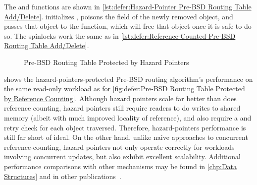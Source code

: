 \begin{fcvref}
The  and  functions are shown in
\cref{lst:defer:Hazard-Pointer Pre-BSD Routing Table Add/Delete}.
 initializes ,
 poisons the  field of the newly removed
object, and
 passes that object to the
 function, which will free that object once it
is safe to do so.
The spinlocks work the same as in
\cref{lst:defer:Reference-Counted Pre-BSD Routing Table Add/Delete}.
\end{fcvref}

\begin{figure}
\centering
{}
\caption{Pre-BSD Routing Table Protected by Hazard Pointers}
\label{fig:defer:Pre-BSD Routing Table Protected by Hazard Pointers}
\end{figure}

shows the hazard-pointers-protected Pre-BSD routing algorithm's
performance on the same read-only workload as for
\cref{fig:defer:Pre-BSD Routing Table Protected by Reference Counting}.
Although hazard pointers scale far better than does reference counting,
hazard pointers still require readers to do writes to shared
memory (albeit with much improved locality of reference),
and also require a  and retry check for each
object traversed.
Therefore, hazard-pointers performance is still far short of ideal.
On the other hand, unlike naive approaches to concurrent
reference-counting, hazard pointers not only operate correctly for
workloads involving concurrent updates, but also exhibit excellent
scalability.
Additional performance comparisons with other mechanisms may be found in
\cref{chp:Data Structures}
and in other publications~\cite{ThomasEHart2007a,McKenney:2013:SDS:2483852.2483867,MagedMichael04a}.

